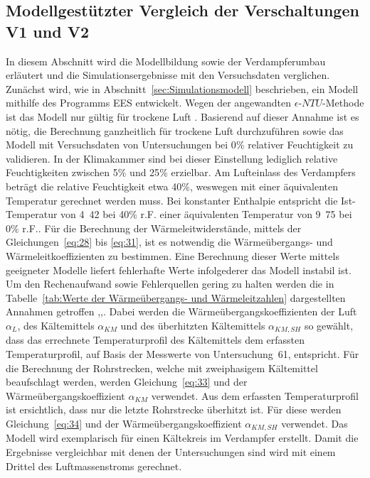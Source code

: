 \clearpage

\subsection{Modellgestützter Vergleich der Verschaltungen V1 und V2}
\label{subsec:Modellgestützter Vergleich der Verschaltungen V1 und V2}

In diesem Abschnitt wird die Modellbildung sowie der Verdampferumbau erläutert und die Simulationsergebnisse mit den Versuchsdaten verglichen.
Zunächst wird, wie in Abschnitt~\ref{sec:Simulationsmodell} beschrieben, ein Modell mithilfe des Programms EES entwickelt. Wegen der angewandten $\epsilon$-$NTU$-Methode ist das Modell nur gültig für trockene Luft \cite{Bergman.2011}. Basierend auf dieser Annahme ist es nötig, die Berechnung ganzheitlich für trockene Luft durchzuführen sowie das Modell mit Versuchsdaten von Untersuchungen bei \unit{0}{\%} relativer Feuchtigkeit zu validieren. In der Klimakammer sind bei dieser Einstellung lediglich relative Feuchtigkeiten zwischen \unit{5}{\%} und \unit{25}{\%} erzielbar. Am Lufteinlass des Verdampfers beträgt die relative Feuchtigkeit etwa \unit{40}{\%}, weswegen mit einer äquivalenten Temperatur gerechnet werden muss. Bei konstanter Enthalpie entspricht die Ist-Temperatur von \unit{4.42}{\celsius} bei \unit{40}{\%} r.F. einer äquivalenten Temperatur von \unit{9.75}{\celsius} bei \unit{0}{\%} r.F.. \newline
Für die Berechnung der Wärmeleitwiderstände, mittels der Gleichungen~\ref{eq:28} bis \ref{eq:31}, ist es notwendig die Wärmeübergangs- und Wärmeleitkoeffizienten zu bestimmen. Eine Berechnung dieser Werte mittels geeigneter Modelle liefert fehlerhafte Werte infolgederer das Modell instabil ist. Um den Rechenaufwand sowie Fehlerquellen gering zu halten werden die in Tabelle~\ref{tab:Werte der Wärmeübergangs- und Wärmeleitzahlen} dargestellten Annahmen getroffen \cite{Bergman.2011},\cite{Recknagel.2005},\cite{DINDeutschesInstitutfurNormunge.V..2017d}. Dabei werden die Wärmeübergangskoeffizienten der Luft $\alpha_L$, des Kältemittels $\alpha_{KM}$ und des überhitzten Kältemittels $\alpha_{KM,SH}$ so gewählt, dass das errechnete Temperaturprofil des Kältemittels dem erfassten Temperaturprofil, auf Basis der Messwerte von Untersuchung~61, entspricht. 
Für die Berechnung der Rohrstrecken, welche mit zweiphasigem Kältemittel beaufschlagt werden, werden Gleichung~\ref{eq:33} und der Wärmeübergangskoeffizient $\alpha_{KM}$ verwendet. Aus dem erfassten Temperaturprofil ist ersichtlich, dass nur die letzte Rohrstrecke überhitzt ist. Für diese werden Gleichung~\ref{eq:34} und der Wärmeübergangskoeffizient $\alpha_{KM,SH}$ verwendet. \newline
Das Modell wird exemplarisch für einen Kältekreis im Verdampfer erstellt. Damit die Ergebnisse vergleichbar mit denen der Untersuchungen sind wird mit einem Drittel des Luftmassenstroms gerechnet. 

